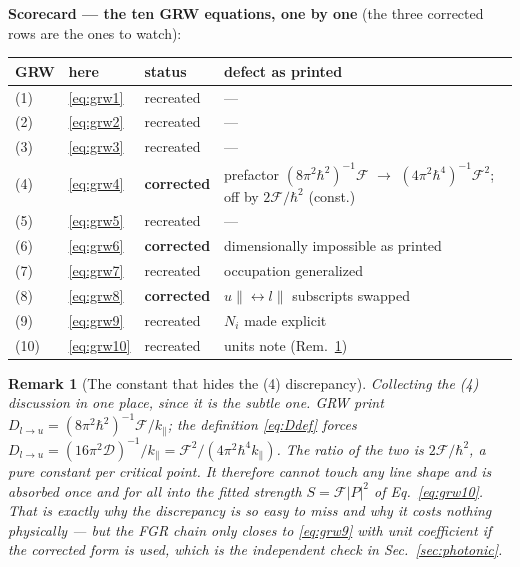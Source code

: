 \documentclass[11pt,a4paper]{article}
\numberwithin{equation}{section}
\newcommand{\cD}{\mathcal{D}}
\newcommand{\cF}{\mathcal{F}}
\newcommand{\kpar}{k_{\parallel}}
\newtheorem{remark}{Remark}[section]
\begin{document}
\medskip
\noindent\textbf{Scorecard --- the ten GRW equations, one by one}
(the three corrected rows are the ones to watch):
\begin{center}
\begin{tabular}{llll}
\toprule
GRW & here & status & defect as printed\\
\midrule
(1) & \eqref{eq:grw1} & recreated & ---\\
(2) & \eqref{eq:grw2} & recreated & ---\\
(3) & \eqref{eq:grw3} & recreated & ---\\
(4) & \eqref{eq:grw4} & \textbf{\textcolor{BrickRed}{corrected}} &
 prefactor $(8\pi^2\hbar^2)^{-1}\cF$ $\to$ $(4\pi^2\hbar^4)^{-1}\cF^2$;
 off by $2\cF/\hbar^2$ (const.)\\
(5) & \eqref{eq:grw5} & recreated & ---\\
(6) & \eqref{eq:grw6} & \textbf{\textcolor{BrickRed}{corrected}} & dimensionally impossible as printed\\
(7) & \eqref{eq:grw7} & recreated & occupation generalized\\
(8) & \eqref{eq:grw8} & \textbf{\textcolor{BrickRed}{corrected}} &
 $u\parallel\leftrightarrow l\parallel$ subscripts swapped\\
(9) & \eqref{eq:grw9} & recreated & $N_i$ made explicit\\
(10) & \eqref{eq:grw10} & recreated & units note (Rem.~\ref{rem:eq4})\\
\bottomrule
\end{tabular}
\end{center}

\begin{remark}[The constant that hides the (4) discrepancy]\label{rem:eq4}
Collecting the (4) discussion in one place, since it is the subtle
one. GRW print $D_{l\to u}=(8\pi^2\hbar^2)^{-1}\cF/\kpar$; the
definition \eqref{eq:Ddef} forces
$D_{l\to u}=(16\pi^2\cD)^{-1}/\kpar=\cF^2/(4\pi^2\hbar^4\kpar)$. The
ratio of the two is $2\cF/\hbar^2$, a pure constant per critical
point. It therefore cannot touch any line shape and is absorbed once
and for all into the fitted strength $S=\cF|P|^2$ of
Eq.~\eqref{eq:grw10}. That is exactly why the discrepancy is so easy
to miss and why it costs nothing physically --- but the FGR chain only
closes to \eqref{eq:grw9} with unit coefficient if the corrected form
is used, which is the independent check in Sec.~\ref{sec:photonic}.
\end{remark}

\end{document}
